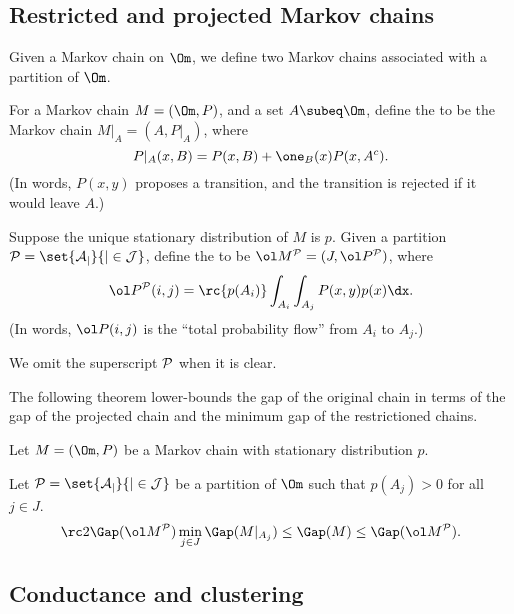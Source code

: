 \subsection{Restricted and projected Markov chains}

Given a Markov chain on $\Om$, we define two Markov chains associated with a partition of $\Om$.
\begin{df}\label{df:assoc-mc}
For a Markov chain $M=(\Om, P)$, and a set $A\subeq \Om$, define the  to be the Markov chain $M|_A = (A, P|_{A})$, where
$$
P|_A(x,B) = P(x,B) + \one_B(x) P(x,A^c).
$$
(In words, $P(x,y)$ proposes a transition, and the transition is rejected if it would leave $A$.)

Suppose the unique stationary distribution of $M$ is $p$. 
Given a partition $\cal P = \set{A_j}{j\in J}$, define the  to be $\ol M^{\cal P} = (J, \ol P^{\cal P})$, where
$$
\ol P^{\cal P} (i,j) = 
\rc{p(A_i)} \int_{A_i}\int_{A_j} P(x,y)p(x)\dx.
$$
(In words, $\ol P(i,j)$ is the ``total probability flow'' from $A_i$ to $A_j$.)

We omit the superscript $\cal P$ when it is clear.
\end{df}

The following theorem lower-bounds the gap of the original chain in terms of the gap of the projected chain and the minimum gap of the restrictioned chains.
\begin{thm}\label{thm:gap-product}
Let $M=(\Om, P)$ be a Markov chain with stationary distribution $p$. 

Let $\cal P=\set{A_j}{j\in J}$ be a partition of $\Om$ such that $p(A_j)>0$ for all $j\in J$. %
$$
\rc 2 \Gap(\ol M^{\cal P}) \min_{j\in J}\Gap(M|_{A_j}) \le \Gap(M) \le \Gap(\ol M^{\cal P}).
$$
\end{thm}

\subsection{Conductance and clustering}

